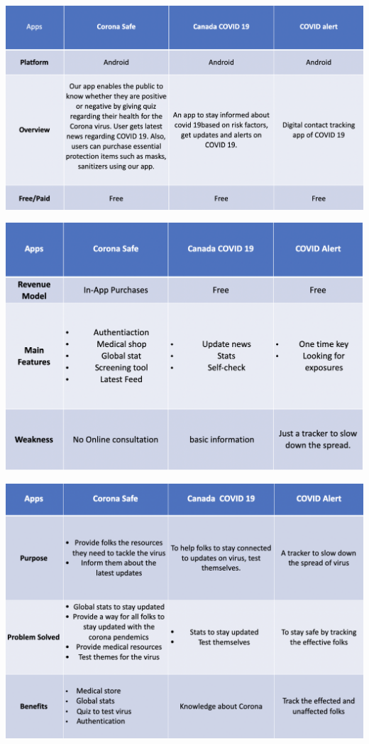\begin{center}
\includegraphics[scale=0.55]{Research .png}\\[0.75cm]
\end{center}
\begin{center}
\includegraphics[scale=0.65]{Study.png}\\[0.75cm]
\end{center}
\begin{center}
\includegraphics[scale=0.80]{Analyse.png}\\[0.75cm]
\end{center}
